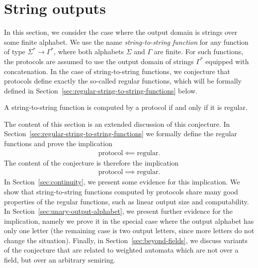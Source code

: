 \section{String outputs}
\label{sec:string-outputs}

In this section, we consider the case where the output domain is strings over some finite alphabet. We use the name \emph{string-to-string function} for any function of type $\Sigma^* \to \Gamma^*$, where both alphabets $\Sigma$ and $\Gamma$ are finite. For such functions, the protocols are assumed to use the output domain of strings $\Gamma^*$ equipped with concatenation. 
 In the case of string-to-string functions, we conjecture that protocols define exactly the so-called regular functions, which will be formally defined in Section~\ref{sec:regular-string-to-string-functions} below.
 


\begin{conjecture}\label{conj:protocol-regular-string-to-string}
    A string-to-string function is computed by a protocol if and only if it is regular. 
\end{conjecture}

The content of this section is an extended discussion of this conjecture.
In Section~\ref{sec:regular-string-to-string-functions} we  formally  define the regular functions and  prove the implication 
\begin{align*}
\text{protocol} \impliedby \text{regular}.
\end{align*}
The content of the conjecture is therefore the implication 
\begin{align*}
\text{protocol} \implies \text{regular}.
\end{align*}
In Section~\ref{sec:continuity}, we present some evidence for this implication. We  show that string-to-string functions computed by protocols share many good properties of the regular functions, such as linear output size and computability. In Section~\ref{sec:unary-output-alphabet}, we present further evidence for the implication, namely we  prove it in the special case where the output alphabet has only one letter (the remaining case is two output letters, since more letters do not change the situation). Finally, in Section~\ref{sec:beyond-fields}, we discuss variants of the conjecture that are related to weighted automata which are not over a field, but over an arbitrary semiring. 




